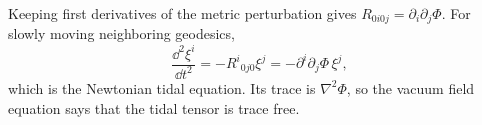 \begin{enumerate}[leftmargin=2.8em,itemsep=1.2em]
Keeping first derivatives of the metric perturbation gives
\(R_{0i0j}=\partial_i\partial_j\Phi\).  For slowly moving neighboring
geodesics,
\[
 \frac{\dd^2\xi^i}{\dd t^2}=-R^i{}_{0j0}\xi^j
 =-\partial^i\partial_j\Phi\,\xi^j,
\]
which is the Newtonian tidal equation.  Its trace is \(\nabla^2\Phi\), so the
vacuum field equation says that the tidal tensor is trace free.
\end{enumerate}
